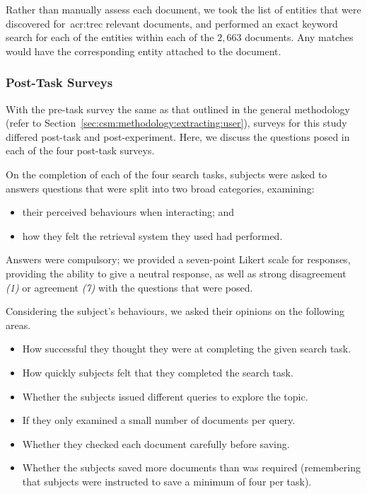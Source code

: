 Rather than manually assess each document, we took the list of entities that were discovered for~\gls{acr:trec} relevant documents, and performed an exact keyword search for each of the entities within each of the $2,663$ documents. Any matches would have the corresponding entity attached to the document.

\subsubsection{Post-Task Surveys}\label{sec:diversity:users:posttask}
With the pre-task survey the same as that outlined in the general methodology (refer to Section~\ref{sec:csm:methodology:extracting:user}), surveys for this study differed post-task and post-experiment. Here, we discuss the questions posed in each of the four post-task surveys.

On the completion of each of the four search tasks, subjects were asked to answers questions that were split into two broad categories, examining:

\begin{itemize}
    \item{their perceived behaviours when interacting; and}
    \item{how they felt the retrieval system they used had performed.}
\end{itemize}

Answers were compulsory; we provided a seven-point Likert scale for responses, providing the ability to give a neutral response, as well as strong disagreement \emph{(1)} or agreement \emph{(7)} with the questions that were posed.

Considering the subject's behaviours, we asked their opinions on the following areas.

\begin{itemize}
    \item{ How successful they thought they were at completing the given search task.}
    \item{ How quickly subjects felt that they completed the search task.}
    \item{ Whether the subjects issued different queries to explore the topic.}
    \item{ If they only examined a small number of documents per query.}
    \item{ Whether they checked each document carefully before saving.}
    \item{ Whether the subjects saved more documents than was required (remembering that subjects were instructed to save a minimum of four per task).}
\end{itemize}

